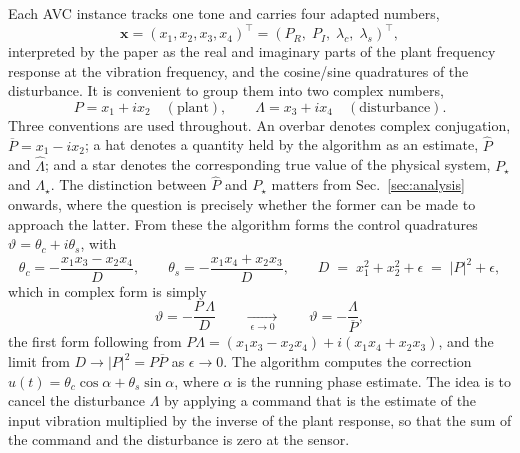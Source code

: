 \documentclass[11pt]{article}
\newcommand{\vx}{\mathbf{x}}
\begin{document}
Each AVC instance tracks one tone and carries four adapted numbers,
%
\begin{equation}
  \vx=(x_1,x_2,x_3,x_4)^\top=(P_R,\;P_I,\;\lambda_c,\;\lambda_s)^\top,
\end{equation}
%
interpreted by the paper as the real and imaginary parts of the plant frequency response at the vibration frequency, and the cosine/sine quadratures of the disturbance.
%
It is convenient to group them into two complex numbers,
%
\begin{equation}
  P=x_1+ix_2 \quad(\text{plant}),
  \qquad
  \Lambda=x_3+ix_4 \quad(\text{disturbance}).
\end{equation}
%
Three conventions are used throughout. An overbar denotes complex
conjugation, $\overline{P}=x_1-ix_2$; a hat denotes a quantity held by the
algorithm as an estimate, $\hat P$ and $\hat\Lambda$; and a star denotes
the corresponding true value of the physical system, $P_\star$ and
$\Lambda_\star$. The distinction between $\hat P$ and $P_\star$ matters
from Sec.~\ref{sec:analysis} onwards, where the question is precisely
whether the former can be made to approach the latter.
%
From these the algorithm forms the control quadratures $\vartheta=\theta_c+i\theta_s$, with
%
\begin{equation}
  \theta_c=-\frac{x_1x_3-x_2x_4}{D},
  \qquad
  \theta_s=-\frac{x_1x_4+x_2x_3}{D},
  \qquad
  D \;=\; x_1^2+x_2^2+\epsilon \;=\; |P|^2+\epsilon ,
  \label{eq:theta}
\end{equation}
%
which in complex form is simply
\begin{equation}
  \vartheta=-\frac{P\,\Lambda}{D}
  \qquad\xrightarrow[\;\epsilon\to0\;]{}\qquad
  \vartheta=-\frac{\Lambda}{\overline{P}} ,
  \label{eq:thetacomplex}
\end{equation}
the first form following from $P\Lambda=(x_1x_3-x_2x_4)+i(x_1x_4+x_2x_3)$,
and the limit from $D\to|P|^2=P\overline{P}$ as $\epsilon\to0$.
%
The algorithm computes the correction $u(t)=\theta_c\cos\alpha+\theta_s\sin\alpha$, where $\alpha$ is the running phase estimate.
%
The idea is to cancel the disturbance $\Lambda$ by applying a command that is the estimate of the input vibration multiplied by the inverse of the plant response, so that the sum of the command and the disturbance is zero at the sensor.
\end{document}
